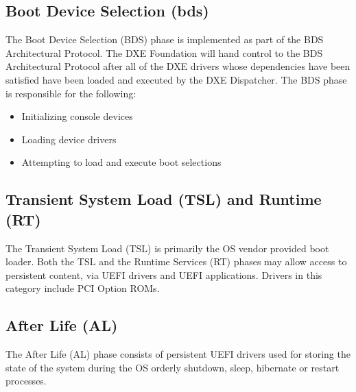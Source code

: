 \subsection{Boot Device Selection (\gls{bds})}
The Boot Device Selection (BDS) phase is implemented as part of the BDS Architectural Protocol. The DXE Foundation will hand control to the BDS Architectural Protocol after all of the DXE drivers whose dependencies have been satisfied have been loaded and executed by the DXE Dispatcher. The BDS phase is responsible for the following:
\begin{itemize}
	\item Initializing console devices
	\item Loading device drivers
	\item Attempting to load and execute boot selections
\end{itemize}

\subsection{Transient System Load (TSL) and Runtime (RT)}
The Transient System Load (TSL) is primarily the OS vendor provided boot loader. Both the TSL and the Runtime Services (RT) phases may allow access to persistent content, via UEFI drivers and UEFI applications. Drivers in this category include PCI Option ROMs.

\subsection{After Life (AL)}
The After Life (AL) phase consists of persistent UEFI drivers used for storing the state of the system during the OS orderly shutdown, sleep, hibernate or restart processes.

